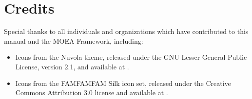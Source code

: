 \chapter{Credits}

Special thanks to all individuals and organizations which have contributed to this manual and the MOEA Framework, including:

\begin{itemize}
  \item Icons from the Nuvola theme, released under the GNU Lesser General Public License, version 2.1, and available at .
  \item Icons from the FAMFAMFAM Silk icon set, released under the Creative Commons Attribution 3.0 license and available at .
\end{itemize}